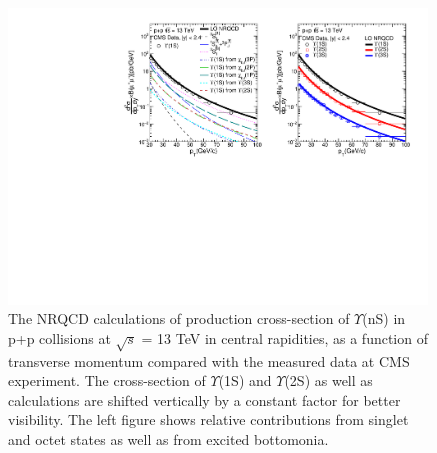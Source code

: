 \begin{figure}
  \centering
  \includegraphics[width=0.99\textwidth]{Figures/NRQCD_Beauty/Fig_CMS_YnS_Rap12_13TeV_Pt.pdf}
  \caption{\small{The NRQCD calculations of production cross-section of $\Upsilon$(nS) in p+p collisions at 
      $\sqrt{s}$ = 13 TeV in central rapidities, as a function of transverse momentum compared with the measured data 
      at CMS~\cite{Sirunyan:2017qdw} experiment. The cross-section of $\Upsilon$(1S) and $\Upsilon$(2S) as well as calculations are
      shifted vertically by a constant factor for better visibility. The left figure shows relative contributions from
      singlet and octet states as well as from excited bottomonia.}}
  \label{Fig:SigmaYnSCMS13TeV}
\end{figure}



